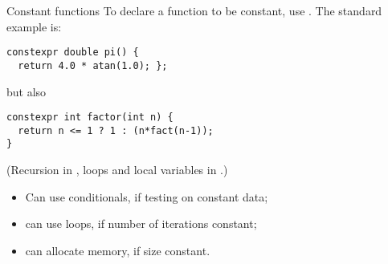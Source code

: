 \begin{block}{Constant functions}
  \label{sl:constexpr}
  To declare a function to be constant, use
  . The standard example is:
\begin{lstlisting}
constexpr double pi() {
  return 4.0 * atan(1.0); };
\end{lstlisting}
but also
\begin{lstlisting}
constexpr int factor(int n) {
  return n <= 1 ? 1 : (n*fact(n-1));
}
\end{lstlisting}
(Recursion in ,
loops and local variables in .)
\end{block}

\begin{itemize}
\item Can use conditionals, if testing on constant data;
\item can use loops, if number of iterations constant;
\item {} can allocate memory, if size constant.
\end{itemize}

